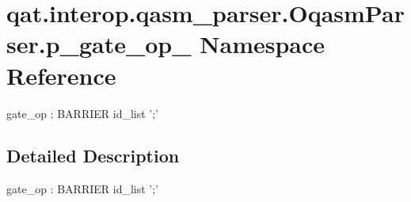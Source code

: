 \hypertarget{namespaceqat_1_1interop_1_1qasm__parser_1_1OqasmParser_1_1p__gate__op__5}{\section{qat.\-interop.\-qasm\-\_\-parser.\-Oqasm\-Parser.\-p\-\_\-gate\-\_\-op\-\_ Namespace Reference}
\label{namespaceqat_1_1interop_1_1qasm__parser_1_1OqasmParser_1_1p__gate__op__5}
}


gate\-\_\-op \-: B\-A\-R\-R\-I\-E\-R id\-\_\-list ';'  




\subsection{Detailed Description}
gate\-\_\-op \-: B\-A\-R\-R\-I\-E\-R id\-\_\-list ';' 